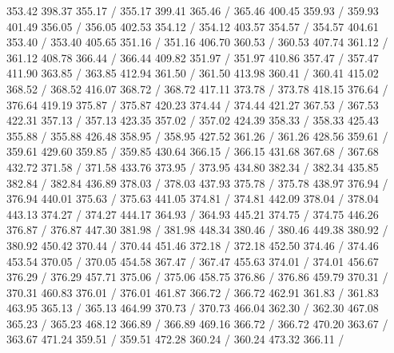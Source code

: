 { 353.42 398.37 355.17 /
 355.17 399.41 365.46 /
 365.46 400.45 359.93 /
 359.93 401.49 356.05 /
 356.05 402.53 354.12 /
 354.12 403.57 354.57 /
 354.57 404.61 353.40 /
 353.40 405.65 351.16 /
 351.16 406.70 360.53 /
 360.53 407.74 361.12 /
 361.12 408.78 366.44 /
 366.44 409.82 351.97 /
 351.97 410.86 357.47 /
 357.47 411.90 363.85 /
 363.85 412.94 361.50 /
 361.50 413.98 360.41 /
 360.41 415.02 368.52 /
 368.52 416.07 368.72 /
 368.72 417.11 373.78 /
 373.78 418.15 376.64 /
 376.64 419.19 375.87 /
 375.87 420.23 374.44 /
 374.44 421.27 367.53 /
 367.53 422.31 357.13 /
 357.13 423.35 357.02 /
 357.02 424.39 358.33 /
 358.33 425.43 355.88 /
 355.88 426.48 358.95 /
 358.95 427.52 361.26 /
 361.26 428.56 359.61 /
 359.61 429.60 359.85 /
 359.85 430.64 366.15 /
 366.15 431.68 367.68 /
 367.68 432.72 371.58 /
 371.58 433.76 373.95 /
 373.95 434.80 382.34 /
 382.34 435.85 382.84 /
 382.84 436.89 378.03 /
 378.03 437.93 375.78 /
 375.78 438.97 376.94 /
 376.94 440.01 375.63 /
 375.63 441.05 374.81 /
 374.81 442.09 378.04 /
 378.04 443.13 374.27 /
 374.27 444.17 364.93 /
 364.93 445.21 374.75 /
 374.75 446.26 376.87 /
 376.87 447.30 381.98 /
 381.98 448.34 380.46 /
 380.46 449.38 380.92 /
 380.92 450.42 370.44 /
 370.44 451.46 372.18 /
 372.18 452.50 374.46 /
 374.46 453.54 370.05 /
 370.05 454.58 367.47 /
 367.47 455.63 374.01 /
 374.01 456.67 376.29 /
 376.29 457.71 375.06 /
 375.06 458.75 376.86 /
 376.86 459.79 370.31 /
 370.31 460.83 376.01 /
 376.01 461.87 366.72 /
 366.72 462.91 361.83 /
 361.83 463.95 365.13 /
 365.13 464.99 370.73 /
 370.73 466.04 362.30 /
 362.30 467.08 365.23 /
 365.23 468.12 366.89 /
 366.89 469.16 366.72 /
 366.72 470.20 363.67 /
 363.67 471.24 359.51 /
 359.51 472.28 360.24 /
 360.24 473.32 366.11 /
}
